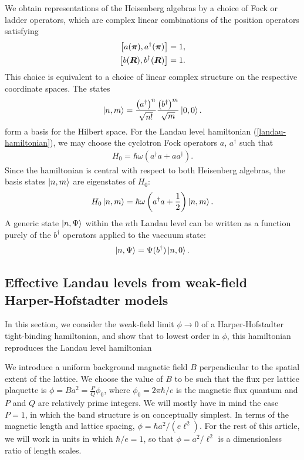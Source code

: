 \documentclass[aps,prb,twocolumn,letterpaper,twoside,nobalancelastpage,groupedaddress,amsmath,amssymb,floatfix,citeautoscript]{revtex4-1}
\begin{document}

We obtain representations of the Heisenberg algebras by a choice of Fock or ladder operators, which are complex linear combinations of the position operators satisfying
\begin{align*}
\comm{a(\boldsymbol{\pi})}{a^{\dag}(\boldsymbol{\pi})} &= 1, \\
\comm{b(\boldsymbol{R})}{b^{\dag}(\boldsymbol{R})} &= 1.
\end{align*}
This choice is equivalent to a choice of linear complex structure on the respective coordinate spaces. The states 
\begin{align}
\label{basis-state}
\ket{n,m} = \frac{\left(a^{\dag}\right)^n}{\sqrt{n!}}\frac{\left(b^{\dag}\right)^m}{\sqrt{m}} \ket{0,0}.
\end{align}
form a basis for the Hilbert space. For the Landau level hamiltonian (\ref{landau-hamiltonian}), we may choose the cyclotron Fock operators $a$, $a^{\dag}$ such that
\begin{align*}
H_0 = \hbar \omega \left(a^{\dag}a + a a^{\dag}\right).
\end{align*}
Since the hamiltonian is central with respect to both Heisenberg algebras, the basis states $\ket{n,m}$ are eigenstates of $H_0$:
\begin{align*}
H_0 \ket{n,m} = \hbar \omega \left(a^{\dag}a + \frac{1}{2}\right)\ket{n,m}.
\end{align*}
A generic state $\ket{n,\Psi}$ within the $n$th Landau level can be written as a function purely of the $b^{\dag}$ operators applied to the vaccuum state:
\begin{align*}
\ket{n,\Psi} = \Psi(b^{\dag})\ket{n,0}.
\end{align*}

\subsection{Effective Landau levels from weak-field Harper-Hofstadter models}
\label{landau-level-limit}
In this section, we consider the weak-field limit $\phi \rightarrow 0$ of a Harper-Hofstadter tight-binding hamiltonian, and show that to lowest order in $\phi$, this hamiltonian reproduces the Landau level hamiltonian

We introduce a uniform background magnetic field $B$ perpendicular to the spatial extent of the lattice. We choose the value of $B$ to be such that the flux per lattice plaquette is $\phi = Ba^2 = \frac{P}{Q}\phi_0$, where $\phi_0 = 2\pi \hbar /e$ is the magnetic flux quantum and $P$ and $Q$ are relatively prime integers. We will mostly have in mind the case $P =1$, in which the band structure is on conceptually simplest.\cite{Harper:2014vi} In terms of the magnetic length and lattice spacing, $\phi = \hbar a^2/(e \ell^2)$. For the rest of this article, we will work in units in which $\hbar/e= 1$, so that $\phi =a^2/\ell^2$ is a dimensionless ratio of length scales.
\end{document}
